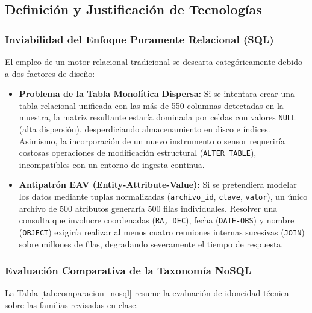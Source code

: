 \documentclass[10pt]{article}
\begin{document}
\subsection{Definición y Justificación de Tecnologías}

\subsubsection{Inviabilidad del Enfoque Puramente Relacional (SQL)}
El empleo de un motor relacional tradicional se descarta categóricamente debido a dos factores de diseño:
\begin{itemize}
    \item \textbf{Problema de la Tabla Monolítica Dispersa:} Si se intentara crear una tabla relacional unificada con las más de 550 columnas detectadas en la muestra, la matriz resultante estaría dominada por celdas con valores \texttt{NULL} (alta dispersión), desperdiciando almacenamiento en disco e índices. Asimismo, la incorporación de un nuevo instrumento o sensor requeriría costosas operaciones de modificación estructural (\texttt{ALTER TABLE}), incompatibles con un entorno de ingesta continua.
    \item \textbf{Antipatrón EAV (Entity-Attribute-Value):} Si se pretendiera modelar los datos mediante tuplas normalizadas (\texttt{archivo\_id}, \texttt{clave}, \texttt{valor}), un único archivo de 500 atributos generaría 500 filas individuales. Resolver una consulta que involucre coordenadas (\texttt{RA, DEC}), fecha (\texttt{DATE-OBS}) y nombre (\texttt{OBJECT}) exigiría realizar al menos cuatro reuniones internas sucesivas (\texttt{JOIN}) sobre millones de filas, degradando severamente el tiempo de respuesta.
\end{itemize}

\subsubsection{Evaluación Comparativa de la Taxonomía NoSQL}
La Tabla \ref{tab:comparacion_nosql} resume la evaluación de idoneidad técnica sobre las familias revisadas en clase.
\end{document}
